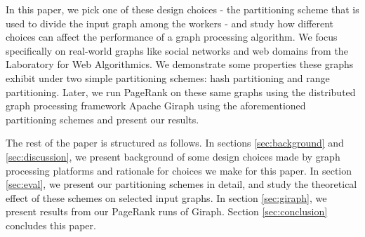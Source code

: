 In this paper, we pick one of these design choices - the partitioning scheme 
that is used to divide the input graph among the workers - and study how 
different choices can affect the performance of a graph processing algorithm.
We focus specifically on real-world graphs like social networks and web domains 
from the Laboratory for Web Algorithmics\cite{BoVWFI}\cite{BRSLLP}. We 
demonstrate some properties these graphs exhibit under two simple partitioning 
schemes: hash partitioning and range partitioning. 
Later, we run PageRank on these same graphs using the distributed graph 
processing framework Apache Giraph \cite{ApacheGiraph} using the aforementioned 
partitioning schemes and present our results.

The rest of the paper is structured as follows. In sections \ref{sec:background} and \ref{sec:discussion},
we present background of some design choices made by graph processing platforms and rationale for 
choices we make for this paper. In section \ref{sec:eval}, we present 
our partitioning schemes in detail, and study the theoretical effect of these 
schemes on selected 
input graphs. In section \ref{sec:giraph}, we present results 
from our PageRank 
runs of Giraph. Section \ref{sec:conclusion} concludes this paper.


